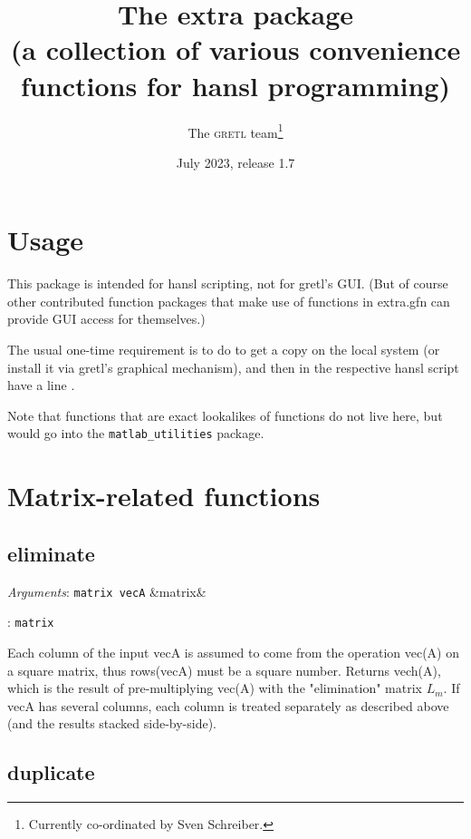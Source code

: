 \documentclass[11pt,english]{article}
\newcommand{\noun}[1]{\textsc{#1}}
\newcommand{\ArgRet}[2]{%
  {\it Arguments}: {#1}%
  \ifx&#2&%
  \else
  \par\smallskip\noindent {\it Return type}: \texttt{#2}
  \fi%
  \par\medskip\par%
  }
\begin{document}
\title{The extra package\\
(a collection of various convenience functions for hansl programming) }

\date{July 2023, release 1.7}

\author{The \noun{gretl} team\thanks{Currently co-ordinated by Sven
Schreiber.}}

\maketitle
\tableofcontents{}

\section{Usage}

This package is intended for hansl scripting, not for gretl's GUI.
(But of course other contributed function packages that make use of
functions in extra.gfn can provide GUI access for themselves.)

The usual one-time requirement is to do 
to get a copy on the local system (or install it via gretl's graphical
mechanism), and then in the respective hansl script have a line .

Note that functions that are exact lookalikes of 
functions do not live here, but would go into the
\texttt{matlab\_utilities} package.


\section{Matrix-related functions}

\subsection{eliminate}

\ArgRet{\texttt{matrix vecA}}{matrix}

Each column of the input vecA is assumed to come from the operation vec(A)
on a square matrix, thus rows(vecA) must be a square number.
Returns vech(A), which is the result of pre-multiplying vec(A) with the
"elimination" matrix $L_m$.
If vecA has several columns, each column is
treated separately as described above (and the results stacked side-by-side).

\subsection{duplicate}
\end{document}
